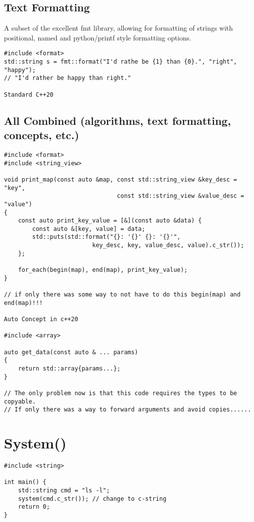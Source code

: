 \subsection{Text Formatting}

A subset of the excellent {fmt} library, allowing for formatting of strings with positional,
named and python/printf style formatting options.

\begin{verbatim}
#include <format>
std::string s = fmt::format("I'd rathe be {1} than {0}.", "right", "happy");
// "I'd rather be happy than right."

Standard C++20
\end{verbatim}

\subsection{All Combined (algorithms, text formatting, concepts, etc.)}

\begin{verbatim}
#include <format>
#include <string_view>

void print_map(const auto &map, const std::string_view &key_desc = "key",
                                const std::string_view &value_desc = "value")
{
    const auto print_key_value = [&](const auto &data) { 
        const auto &[key, value] = data;
        std::puts(std::format("{}: '{}' {}: '{}'",
                         key_desc, key, value_desc, value).c_str());
    };

    for_each(begin(map), end(map), print_key_value);
}

// if only there was some way to not have to do this begin(map) and end(map)!!!

Auto Concept in c++20

#include <array>

auto get_data(const auto & ... params)
{
    return std::array{params...};
}

// The only problem now is that this code requires the types to be copyable.
// If only there was a way to forward arguments and avoid copies......
\end{verbatim}


\section{System()}

\begin{verbatim}
#include <string>

int main() {
    std::string cmd = "ls -l";
    system(cmd.c_str()); // change to c-string
    return 0;
}
\end{verbatim}

